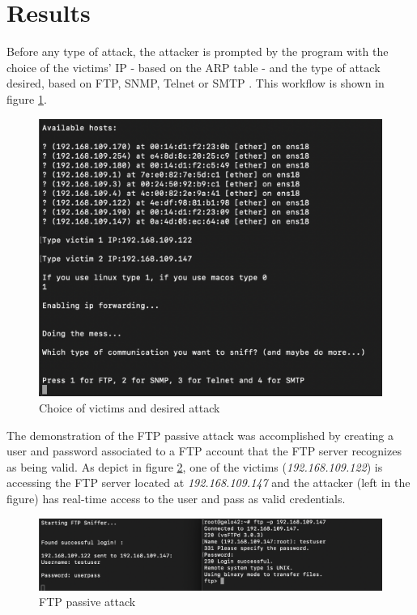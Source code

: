 \section{Results}
Before any type of attack, the attacker is prompted by the program with the choice of the victims' IP - based on the ARP table - and the type of attack desired, based on FTP, SNMP, Telnet or SMTP . This workflow is shown in figure \ref{fig:WorkFlow}.

\begin{figure}[h!]
    \centering
    \includegraphics[width=0.85\linewidth,keepaspectratio]{Choice.png}
    \caption{Choice of victims and desired attack}
    \label{fig:WorkFlow}
\end{figure}
\FloatBarrier

The demonstration of the FTP passive attack was accomplished by creating a user and password associated to a FTP account that the FTP server recognizes as being valid. As depict in figure \ref{fig:FTPAttack}, one of the victims (\textit{192.168.109.122}) is accessing the FTP server located at \textit{192.168.109.147} and the attacker (left in the figure) has real-time access to the user and pass as valid credentials. 

\begin{figure}[h!]
    \centering
    \includegraphics[width=1\linewidth,keepaspectratio]{FTPAttack.png}
    \caption{FTP passive attack}
    \label{fig:FTPAttack}
\end{figure}
\FloatBarrier

